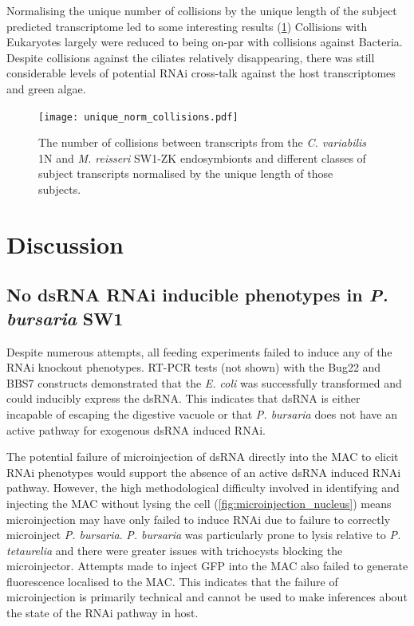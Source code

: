 Normalising the unique number of collisions by the unique length of
the subject predicted transcriptome led to some interesting results (\cref{fig:edicer_unique_norm})
Collisions with Eukaryotes largely were reduced to being on-par
with collisions against Bacteria.
Despite collisions against the ciliates relatively disappearing,
there was still considerable levels of potential RNAi cross-talk against
the host transcriptomes and green algae.

\begin{figure}
    \centering
    \texttt{[image: unique\_norm\_collisions.pdf]}
    \caption[Normalised unique eDicer collisions]{The number of collisions
        between transcripts from the \textit{C. variabilis} 1N
    and \textit{M. reisseri} SW1-ZK endosymbionts and different
classes of subject transcripts normalised by the unique length of those
subjects.}
    \label{fig:edicer_unique_norm}
\end{figure}

\section{Discussion}

\subsection{No dsRNA RNAi inducible phenotypes in \textit{P. bursaria} SW1}

Despite numerous attempts, all feeding experiments failed to induce
any of the RNAi knockout phenotypes.  RT-PCR tests (not shown) with the Bug22
and BBS7 constructs demonstrated
that the \textit{E. coli} was successfully transformed and could 
inducibly express the dsRNA.  
This indicates that dsRNA is either incapable of escaping the digestive vacuole
or that \textit{P. bursaria} does not have an active pathway for exogenous dsRNA 
induced RNAi.

The potential failure of microinjection of dsRNA directly into the MAC
to elicit RNAi phenotypes would support the absence
of an active dsRNA induced RNAi pathway. 
However, the high methodological difficulty involved in identifying and injecting
the MAC without lysing the cell (\cref{fig:microinjection_nucleus}) 
means microinjection may have only failed to induce RNAi due to failure
to correctly microinject \textit{P. bursaria}.   \textit{P. bursaria}
was particularly prone to lysis relative to \textit{P. tetaurelia} and
there were greater issues with trichocysts blocking the microinjector. 
Attempts made to inject GFP into the MAC also failed to generate fluorescence
localised to the MAC.  This indicates that the failure of microinjection is
primarily technical and cannot be used to make inferences about the state
of the RNAi pathway in host. 

